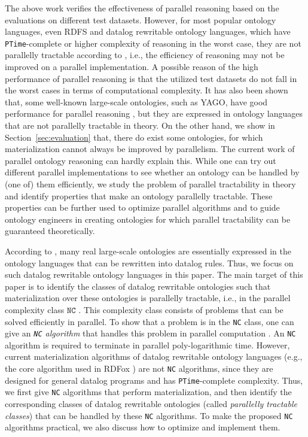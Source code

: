 \documentclass[final,1p,times]{elsarticle}
\begin{document}
The above work verifies the effectiveness of parallel reasoning based on the evaluations on different test datasets.
However, for most popular ontology languages, even RDFS and datalog rewritable ontology languages,
which have \texttt{PTime}-complete or higher complexity of reasoning in the worst case,
they are not parallelly tractable according to \cite{Raymond95}, i.e., the efficiency of reasoning may not be
improved on a parallel implementation. A possible reason of the high performance of parallel
reasoning is that the utilized test datasets do not fall in the worst cases in terms of computational complexity.
It has also been shown that, some well-known large-scale ontologies, such as YAGO, have good performance for parallel
reasoning \cite{KolovskiWE10}, but they are expressed in ontology languages that are not parallelly tractable in theory.
On the other hand, we show in Section~\ref{sec:evaluation} that, there do exist some ontologies, for which materialization cannot
always be improved by parallelism. The current work of parallel ontology reasoning can hardly explain this.
While one can try out different parallel implementations to see whether an ontology can be handled by (one of) them efficiently,
we study the problem of parallel tractability in theory and identify properties that make an ontology parallelly tractable.
These properties can be further used to optimize parallel algorithms and to guide ontology engineers in creating ontologies
for which parallel tractability can be guaranteed theoretically.

According to \cite{MotikNPHO14}, many real large-scale ontologies are essentially expressed in the ontology languages
that can be rewritten into datalog rules. Thus, we focus on such datalog rewritable ontology languages in this paper.
The main target of this paper is to identify the classes of datalog rewritable ontologies such that materialization
over these ontologies is parallelly tractable, i.e., in the parallel complexity class $\texttt{NC}$ \cite{Raymond95}.
This complexity class consists of problems that can be solved efficiently in parallel.
To show that a problem is in the \texttt{NC} class, one can give an \emph{\texttt{NC} algorithm} that handles this problem
in parallel computation \cite{Raymond95}.
An \texttt{NC} algorithm is required to terminate in parallel poly-logarithmic time.
However, current materialization algorithms of datalog rewritable ontology languages
(e.g., the core algorithm used in RDFox \cite{MotikNPHO14}) are not \texttt{NC} algorithms,
since they are designed for general datalog programs and has \texttt{PTime}-complete complexity.
Thus, we first give \texttt{NC} algorithms that perform materialization,
and then identify the corresponding classes of datalog rewritable ontologies (called \emph{parallelly tractable classes})
that can be handled by these \texttt{NC} algorithms. To make the proposed \texttt{NC} algorithms practical,
we also discuss how to optimize and implement them.
\end{document}

